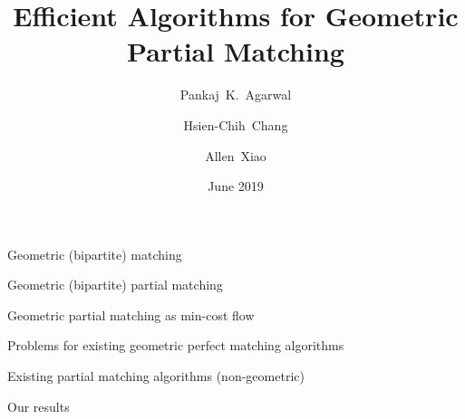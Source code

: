 \documentclass[xcolor={dvipsnames,usenames}]{beamer}
\title{Efficient Algorithms for Geometric Partial Matching}
\author[Allen Xiao]
{
	Pankaj~K.~Agarwal \and
	Hsien-Chih~Chang \and
	Allen~Xiao
}
\institute[SoCG 2019]
{
	Duke University
}
\date{June 2019}
\begin{document}
\begin{frame}
\maketitle
\end{frame}


\begin{frame}{Geometric (bipartite) matching}
\end{frame}

\begin{frame}{Geometric (bipartite) partial matching}
\end{frame}

\begin{frame}{Geometric partial matching as min-cost flow}
\end{frame}

\begin{frame}{Problems for existing geometric perfect matching algorithms}
\end{frame}

\begin{frame}{Existing partial matching algorithms (non-geometric)}


\end{frame}

\begin{frame}{Our results}
\end{frame}


\begin{frame}{}
\end{frame}

\begin{frame}{}
\end{frame}
\end{document}
